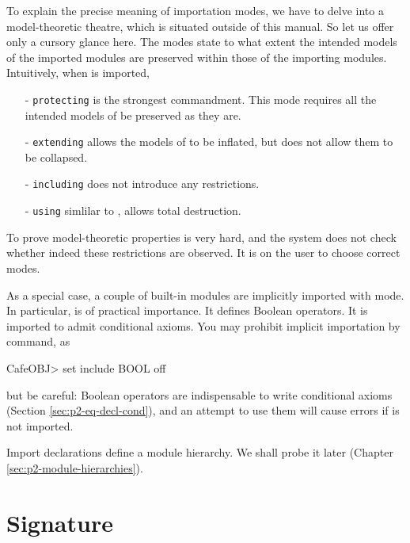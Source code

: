 \documentclass[a4paper]{memoir}
\begin{document}
To explain the precise meaning of importation modes, we have to delve into
a model-theoretic theatre, which is situated outside of this manual. So
let us offer only a cursory glance here.
The modes state to what extent the intended models of the imported modules
are preserved within those of the importing modules. Intuitively,
when  is imported,
\begin{itemize}
\item[-] \texttt{protecting} is the strongest
  commandment.
  This mode requires all the intended models of  be preserved
  as they are.
\item[-] \texttt{extending} allows the models of
   to be inflated, but does not allow them to be
  collapsed.
\item[-] \texttt{including} does not
  introduce any restrictions. 
\item[-] \texttt{using} simlilar to
  , allows total destruction.
\end{itemize}

\begin{warning}
  To prove model-theoretic properties is very hard, and the
  system does not check whether indeed these restrictions are
  observed. It is on the user to choose correct modes.
\end{warning}

As a special case, a couple of built-in modules are implicitly imported
with  mode. In particular, 
is of practical importance. It defines Boolean operators. It
is imported to admit conditional axioms. You may prohibit
implicit importation by  command, as
\begin{vvtm}
\begin{ccode}
  CafeOBJ> set include BOOL off
\end{ccode}
\end{vvtm}
but be careful:
Boolean operators are indispensable to write conditional axioms
(Section \ref{sec:p2-eq-decl-cond}), and an attempt to use them
will cause errors if  is not imported.

Import declarations define a module hierarchy. We shall probe it
later (Chapter \ref{sec:p2-module-hierarchies}).

\chapter{Signature}\label{sec:p2-signature}
\end{document}
